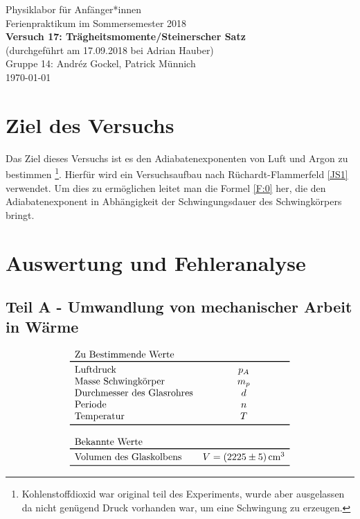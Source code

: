 \documentclass[11pt,a4paper]{article}
\begin{document}
{
\centering 
\large 
Physiklabor für Anf\"anger*innen \\
Ferienpraktikum im Sommersemester 2018 \\[4mm]
\textbf{\LARGE 
Versuch 17: Trägheitsmomente/Steinerscher Satz
} \\[3mm]
(durchgef\"uhrt am 17.09.2018 bei Adrian Hauber)\\
Gruppe 14: Andréz Gockel, Patrick M\"unnich\\ 
\today \\[10mm]
}

\section{Ziel des Versuchs}

Das Ziel dieses Versuchs ist es den Adiabatenexponenten von Luft und Argon zu bestimmen \footnote{Kohlenstoffdioxid war original teil des Experiments, wurde aber ausgelassen da nicht genügend Druck vorhanden war, um eine Schwingung zu erzeugen.}. Hierfür wird ein Versuchsaufbau nach Rüchardt-Flammerfeld \ref{JS1} verwendet. Um dies zu ermöglichen leitet man die Formel \ref{F:0} her, die den Adiabatenexponent in Abhängigkeit der Schwingungsdauer des Schwingkörpers bringt.


\section{Auswertung und Fehleranalyse}

\subsection{Teil A - Umwandlung von mechanischer Arbeit in Wärme }
$$
\begin{array}{lc}
	\multicolumn{1}{l}{\textrm{Zu Bestimmende Werte}} \\
	\toprule 
	\textrm{Luftdruck} & p_A \\
	\textrm{Masse Schwingkörper} & m_{p} \\
	\textrm{Durchmesser des Glasrohres} & d\\
	\textrm{Periode} & n \\
	\textrm{Temperatur} & T\\
	\bottomrule \\
	\multicolumn{2}{l}{\textrm{Bekannte Werte}} \\
	\toprule
	\textrm{Volumen des Glaskolbens} & V = (2225 \pm 5)\,\textrm{cm}^3\\
	\bottomrule 
\end{array}
$$
\end{document}

